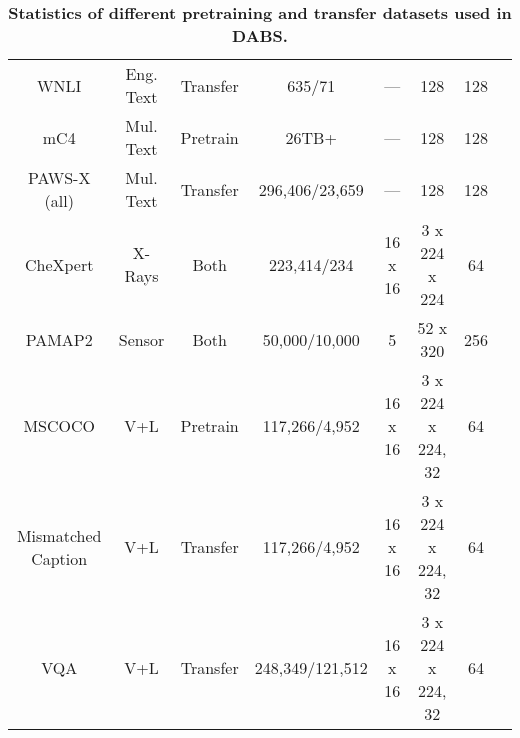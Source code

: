 \documentclass{article}
\begin{document}
\begin{small}
\begin{table}
\begin{tabular}{cccccccc}
WNLI   & Eng. Text & Transfer & 635/71 & --- & 128 & 128 \\
mC4   & Mul. Text & Pretrain & 26TB+ & --- & 128 & 128 \\
PAWS-X (all)   & Mul. Text & Transfer & 296,406/23,659 & --- & 128 & 128 \\
CheXpert   & X-Rays & Both & 223,414/234 & 16 x 16 & 3 x 224 x 224 & 64 \\
PAMAP2   & Sensor & Both & 50,000/10,000 & 5 & 52 x 320 & 256 \\
MSCOCO   & V+L & Pretrain & 117,266/4,952 & 16 x 16 & 3 x 224 x 224, 32 & 64 \\
Mismatched Caption   & V+L & Transfer & 117,266/4,952 & 16 x 16 & 3 x 224 x 224, 32 & 64 \\
VQA   & V+L & Transfer & 248,349/121,512 & 16 x 16 & 3 x 224 x 224, 32 & 64 \\
\bottomrule
\end{tabular}
\vspace{.2cm}
\caption{\textbf{Statistics of different pretraining and transfer datasets used in DABS.}}
\label{table:datasets}
\end{table}
\end{small}
\end{document}

